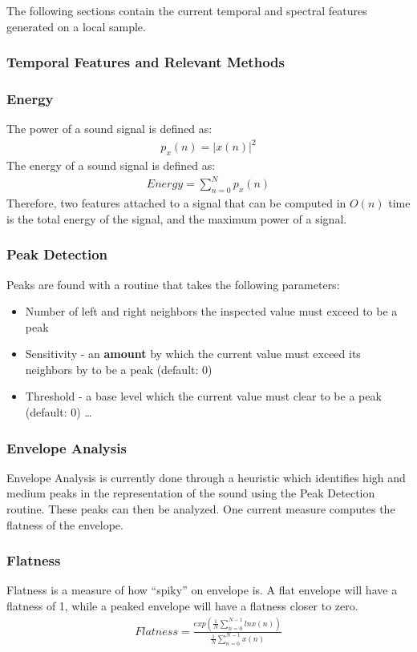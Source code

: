 \documentclass[DIV=calc, paper=a4, fontsize=11pt, twocolumn]{scrartcl}   %
\begin{document}
\par The following sections contain the current temporal and spectral features generated on a local sample.


\subsubsection{Temporal Features and Relevant Methods}
\subsubsection {Energy}
   The power of a sound signal is defined as:
   \begin{align}
      p_x(n) = |x(n)|^2
   \end{align}
   The energy of a sound signal is defined as:
   \begin{align}
     Energy = \sum_{n=0}^N p_x(n)
   \end{align}
   Therefore, two features attached to a signal that can be computed in $O(n)$ time is the total energy of the signal, and the maximum power of a signal.
   \subsubsection {Peak Detection}
   Peaks are found with a routine that takes the following parameters:
      \begin{itemize}
        \item Number of left and right neighbors the inspected value must exceed to be a peak
        \item Sensitivity - an \textbf{amount} by which the current value must exceed its neighbors by to be a peak (default: 0)
        \item Threshold - a base level which the current value must clear to be a peak (default: 0) \ldots
      \end{itemize}
   \subsubsection {Envelope Analysis}
   Envelope Analysis is currently done through a heuristic which identifies high and medium peaks in the representation of the sound using the Peak Detection routine. These peaks can then be analyzed. One current measure computes the flatness of the envelope.
   \subsubsection{Flatness}
      Flatness is a measure of how ``spiky'' on envelope is. A flat envelope will have a flatness of 1, while a peaked envelope will have a flatness closer to zero.
      \begin{align}
      Flatness = \frac{exp(\frac{1}{N}\sum_{n=0}^{N-1}lnx(n))}{\frac{1}{N}\sum_{n=0}^{N-1}x(n)}
      \end{align}
\end{document}

